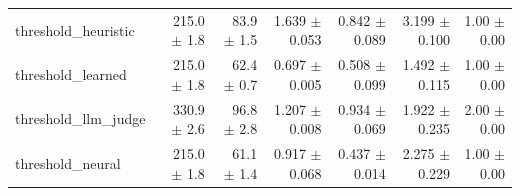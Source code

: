\begin{table}[t]
\begin{tabular}{lrrrrrr}
threshold\_heuristic & 215.0 $\pm$ 1.8 & 83.9 $\pm$ 1.5 & 1.639 $\pm$ 0.053 & 0.842 $\pm$ 0.089 & 3.199 $\pm$ 0.100 & 1.00 $\pm$ 0.00 \\
threshold\_learned & 215.0 $\pm$ 1.8 & 62.4 $\pm$ 0.7 & 0.697 $\pm$ 0.005 & 0.508 $\pm$ 0.099 & 1.492 $\pm$ 0.115 & 1.00 $\pm$ 0.00 \\
threshold\_llm\_judge & 330.9 $\pm$ 2.6 & 96.8 $\pm$ 2.8 & 1.207 $\pm$ 0.008 & 0.934 $\pm$ 0.069 & 1.922 $\pm$ 0.235 & 2.00 $\pm$ 0.00 \\
threshold\_neural & 215.0 $\pm$ 1.8 & 61.1 $\pm$ 1.4 & 0.917 $\pm$ 0.068 & 0.437 $\pm$ 0.014 & 2.275 $\pm$ 0.229 & 1.00 $\pm$ 0.00 \\
\bottomrule
\end{tabular}
\end{table}
